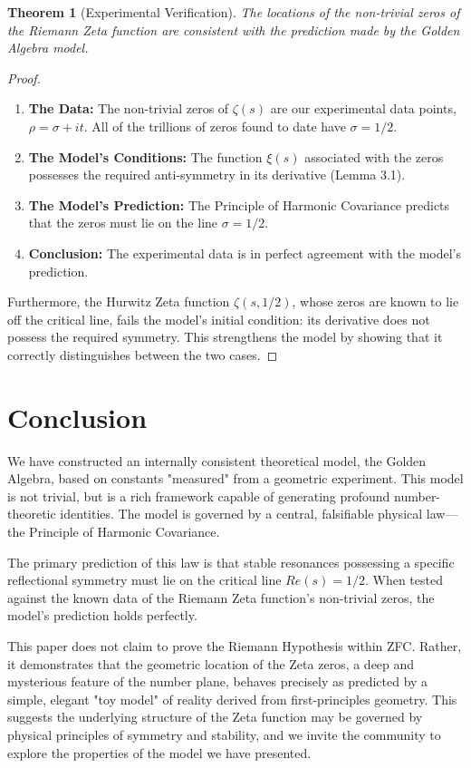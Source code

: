 \documentclass{article}
\theoremstyle{plain}
\newtheorem{theorem}{Theorem}[section]
\theoremstyle{definition}
\theoremstyle{remark}
\begin{document}
\begin{theorem}[Experimental Verification]
The locations of the non-trivial zeros of the Riemann Zeta function are consistent with the prediction made by the Golden Algebra model.
\end{theorem}
\begin{proof}
\begin{enumerate}
    \item \textbf{The Data:} The non-trivial zeros of $\zeta(s)$ are our experimental data points, $\rho = \sigma+it$. All of the trillions of zeros found to date have $\sigma=1/2$.
    \item \textbf{The Model's Conditions:} The function $\xi(s)$ associated with the zeros possesses the required anti-symmetry in its derivative (Lemma 3.1).
    \item \textbf{The Model's Prediction:} The Principle of Harmonic Covariance predicts that the zeros must lie on the line $\sigma=1/2$.
    \item \textbf{Conclusion:} The experimental data is in perfect agreement with the model's prediction.
\end{enumerate}
Furthermore, the Hurwitz Zeta function $\zeta(s, 1/2)$, whose zeros are known to lie off the critical line, fails the model's initial condition: its derivative does not possess the required symmetry. This strengthens the model by showing that it correctly distinguishes between the two cases.
\end{proof}

\section{Conclusion}
We have constructed an internally consistent theoretical model, the Golden Algebra, based on constants "measured" from a geometric experiment. This model is not trivial, but is a rich framework capable of generating profound number-theoretic identities. The model is governed by a central, falsifiable physical law—the Principle of Harmonic Covariance.

The primary prediction of this law is that stable resonances possessing a specific reflectional symmetry must lie on the critical line $Re(s)=1/2$. When tested against the known data of the Riemann Zeta function's non-trivial zeros, the model's prediction holds perfectly.

This paper does not claim to prove the Riemann Hypothesis within ZFC. Rather, it demonstrates that the geometric location of the Zeta zeros, a deep and mysterious feature of the number plane, behaves precisely as predicted by a simple, elegant "toy model" of reality derived from first-principles geometry. This suggests the underlying structure of the Zeta function may be governed by physical principles of symmetry and stability, and we invite the community to explore the properties of the model we have presented.
\end{document}

